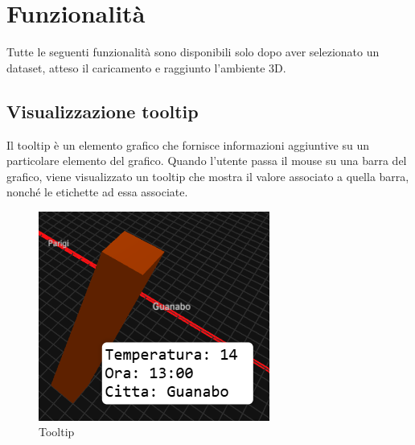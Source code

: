 \section{Funzionalità}
Tutte le seguenti funzionalità sono disponibili solo dopo aver selezionato un
dataset, atteso il caricamento e raggiunto l'ambiente 3D.

\subsection{Visualizzazione tooltip}
Il tooltip è un elemento grafico che fornisce informazioni aggiuntive su un
particolare elemento del grafico. Quando l'utente passa il mouse su una barra
del grafico, viene visualizzato un tooltip che mostra il valore associato a
quella barra, nonché le etichette ad essa associate.
\begin{figure}[h!]
    \centering
    \includegraphics[scale=0.6]{template/images/tooltip.png}
    \caption{Tooltip}
\end{figure}


